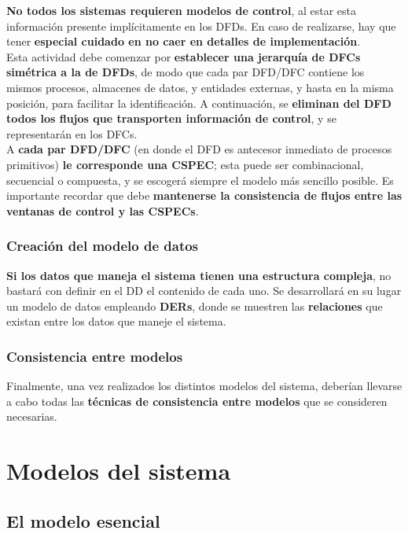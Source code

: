 \textbf{No todos los sistemas requieren modelos de control}, al estar esta información presente implícitamente en los DFDs. En caso de realizarse, hay que tener \textbf{especial cuidado en no caer en detalles de implementación}.\\

Esta actividad debe comenzar por \textbf{establecer una jerarquía de DFCs simétrica a la de DFDs}, de modo que cada par DFD/DFC contiene los mismos procesos, almacenes de datos, y entidades externas, y hasta en la misma posición, para facilitar la identificación. A continuación, se \textbf{eliminan del DFD todos los flujos que transporten información de control}, y se representarán en los DFCs.\\

A \textbf{cada par DFD/DFC} (en donde el DFD es antecesor inmediato de procesos primitivos) \textbf{le corresponde una CSPEC}; esta puede ser combinacional, secuencial o compuesta, y se escogerá siempre el modelo más sencillo posible. Es importante recordar que debe \textbf{mantenerse la consistencia de flujos entre las ventanas de control y las CSPECs}.

\subsubsection{Creación del modelo de datos}

\textbf{Si los datos que maneja el sistema tienen una estructura compleja}, no bastará con definir en el DD el contenido de cada uno. Se desarrollará en su lugar un modelo de datos empleando \textbf{DERs}, donde se muestren las \textbf{relaciones} que existan entre los datos que maneje el sistema.

\subsubsection{Consistencia entre modelos}

Finalmente, una vez realizados los distintos modelos del sistema, deberían llevarse a cabo todas las \textbf{técnicas de consistencia entre modelos} que se consideren necesarias.


\section{Modelos del sistema}

\subsection{El modelo esencial}

